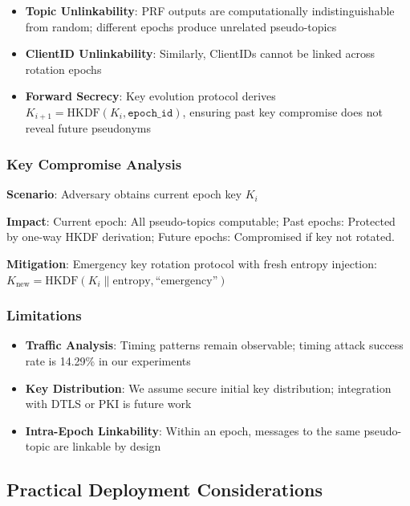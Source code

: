 \documentclass[conference]{IEEEtran}
\begin{document}
\begin{itemize}
    \item \textbf{Topic Unlinkability}: PRF outputs are computationally indistinguishable from random; different epochs produce unrelated pseudo-topics \cite{anonymity_measurement}
    \item \textbf{ClientID Unlinkability}: Similarly, ClientIDs cannot be linked across rotation epochs
    \item \textbf{Forward Secrecy}: Key evolution protocol derives $K_{i+1} = \text{HKDF}(K_i, \texttt{epoch\_id})$, ensuring past key compromise does not reveal future pseudonyms \cite{lightweight_auth_mqtt}
\end{itemize}

\subsubsection{Key Compromise Analysis}

\textbf{Scenario}: Adversary obtains current epoch key $K_i$

\textbf{Impact}: Current epoch: All pseudo-topics computable; Past epochs: Protected by one-way HKDF derivation; Future epochs: Compromised if key not rotated.

\textbf{Mitigation}: Emergency key rotation protocol with fresh entropy injection: $K_{\text{new}} = \text{HKDF}(K_i \| \text{entropy}, \text{``emergency''})$

\subsubsection{Limitations}

\begin{itemize}
    \item \textbf{Traffic Analysis}: Timing patterns remain observable; timing attack success rate is 14.29\% in our experiments \cite{mqtt_covert_channels}
    \item \textbf{Key Distribution}: We assume secure initial key distribution; integration with DTLS or PKI is future work \cite{secure_mqtt_iot}
    \item \textbf{Intra-Epoch Linkability}: Within an epoch, messages to the same pseudo-topic are linkable by design
\end{itemize}

\subsection{Practical Deployment Considerations}
\end{document}
